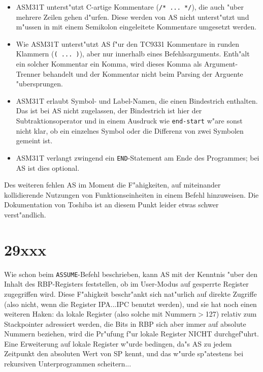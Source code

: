 \documentclass[12pt,a4paper,twoside]{report}
\newcommand{\tty}[1]{{\tt #1}}
\begin{document}
\begin{itemize}
\item{ASM31T unterst"utzt C-artige Kommentare (\verb!/* ... */!),
      die auch "uber mehrere Zeilen gehen d"urfen.  Diese werden
      von AS nicht unterst"utzt und m"ussen in mit einem
      Semikolon eingeleitete Kommentare umgesetzt werden.}
\item{Wie ASM31T unterst"utzt AS f"ur den TC9331 Kommentare in
      runden Klammern (\verb!( ... )!), aber nur innerhalb
      eines Befehlsarguments.  Enth"alt ein solcher Kommentar ein
      Komma, wird dieses Komma als Argument-Trenner behandelt und
      der Kommentar nicht beim Parsing der Arguente
      "ubersprungen.}
\item{ASM31T erlaubt Symbol- und Label-Namen, die einen
      Bindestrich enthalten.  Das ist bei AS nicht zugelassen,
      der Bindestrich ist hier der Subtraktionsoperator und in
      einem Ausdruck wie \verb!end-start! w"are sonst nicht klar,
      ob ein einzelnes Symbol oder die Differenz von zwei
      Symbolen gemeint ist.}
\item{ASM31T verlangt zwingend ein \tty{END}-Statement am Ende
      des Programmes; bei AS ist dies optional.}
\end{itemize}

Des weiteren fehlen AS im Moment die F"ahigkeiten, auf
miteinander kollidierende Nutzungen von Funktionseinheiten in
einem Befehl hinzuweisen.  Die Dokumentation von Toshiba ist an
diesem Punkt leider etwas schwer verst"andlich.


\section{29xxx}

Wie schon beim \tty{ASSUME}-Befehl beschrieben, kann AS mit der Kenntnis
"uber den Inhalt des RBP-Registers feststellen, ob im User-Modus
auf gesperrte Register zugegriffen wird.  Diese F"ahigkeit
beschr"ankt sich nat"urlich auf direkte Zugriffe (also nicht, wenn
die Register IPA...IPC benutzt werden), und sie hat noch einen
weiteren Haken: da lokale Register (also solche mit Nummern$>$127)
relativ zum Stackpointer adressiert werden, die Bits in RBP sich
aber immer auf absolute Nummern beziehen, wird die Pr"ufung f"ur
lokale Register NICHT durchgef"uhrt.  Eine Erweiterung auf lokale
Register w"urde bedingen, da"s AS zu jedem Zeitpunkt den absoluten
Wert von SP kennt, und das w"urde sp"atestens bei rekursiven
Unterprogrammen scheitern...
\end{document}
